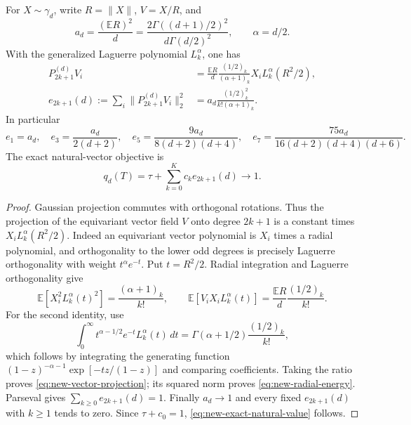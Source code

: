 \begin{proposition}
\label{prop:new-all-radial-energies}
For $X\sim\gamma_d$, write $R=\|X\|$, $V=X/R$, and
\[
 a_d=\frac{(\mathbb ER)^2}{d}
 =\frac{2\Gamma((d+1)/2)^2}{d\Gamma(d/2)^2},\qquad \alpha=d/2.
\]
With the generalized Laguerre polynomial $L_k^\alpha$, one has
\begin{align}
 P_{2k+1}^{(d)}V_i
  &=\frac{\mathbb ER}{d}\frac{(1/2)_k}{(\alpha+1)_k}
             X_iL_k^\alpha(R^2/2),\label{eq:new-vector-projection}\\
 e_{2k+1}(d):=\sum_i\|P_{2k+1}^{(d)}V_i\|_2^2
  &=a_d\frac{(1/2)_k^2}{k!(\alpha+1)_k}.
             \label{eq:new-radial-energy}
\end{align}
In particular
\[
 e_1=a_d,\quad e_3=\frac{a_d}{2(d+2)},\quad
 e_5=\frac{9a_d}{8(d+2)(d+4)},\quad
 e_7=\frac{75a_d}{16(d+2)(d+4)(d+6)}.
\]
The exact natural-vector objective is
\begin{equation}\label{eq:new-exact-natural-value}
 q_d(T)=\tau+\sum_{k=0}^Kc_ke_{2k+1}(d)\longrightarrow1.
\end{equation}
\end{proposition}
\begin{proof}
Gaussian projection commutes with orthogonal rotations.  Thus the
projection of the equivariant vector field $V$ onto degree $2k+1$ is
a constant times $X_iL_k^\alpha(R^2/2)$.  Indeed an equivariant vector
polynomial is $X_i$ times a radial polynomial, and orthogonality to
the lower odd degrees is precisely Laguerre orthogonality with
weight $t^\alpha e^{-t}$.
Put $t=R^2/2$.  Radial integration and Laguerre orthogonality give
\[
 \mathbb E[X_i^2L_k^\alpha(t)^2]=\frac{(\alpha+1)_k}{k!},\qquad
 \mathbb E[V_iX_iL_k^\alpha(t)]
       =\frac{\mathbb ER}{d}\frac{(1/2)_k}{k!}.
\]
For the second identity, use
\[
 \int_0^\infty t^{\alpha-1/2}e^{-t}L_k^\alpha(t)\,dt
       =\Gamma(\alpha+1/2)\frac{(1/2)_k}{k!},
\]
which follows by integrating the generating function
$(1-z)^{-\alpha-1}\exp[-tz/(1-z)]$ and comparing coefficients.
Taking the ratio proves \eqref{eq:new-vector-projection}; its squared
norm proves \eqref{eq:new-radial-energy}.  Parseval gives
$\sum_{k\geq0}e_{2k+1}(d)=1$.  Finally $a_d\to1$ and every fixed
$e_{2k+1}(d)$ with $k\geq1$ tends to zero.  Since $\tau+c_0=1$,
\eqref{eq:new-exact-natural-value} follows.
\end{proof}

